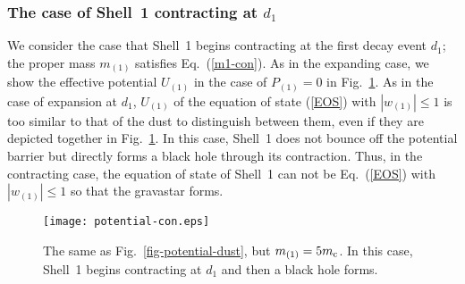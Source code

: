 \documentclass[aps,preprint,preprintnumber,nofootinbib,amsmath,amssymb,ascmac,bm,12pt]{revtex4}
\newcommand{\mo}{m_{(1)}}
\newcommand{\mc}{m_{\rm c}}
\newcommand{\Uon}{U_{(1)}}
\begin{document}
\subsubsection{The case of Shell~1 contracting at $d_1$}

We consider the case that Shell~1 begins contracting at the first decay event $d_1$; the proper mass $\mo$ 
satisfies Eq.~(\ref{m1-con}). As in the expanding case, we show the effective potential $\Uon$ 
in the case of $P_{(1)}=0$ in Fig.~\ref{fig-potential-dust-con}. 
As in the case of expansion at $d_1$, $\Uon$ of the equation of state (\ref{EOS})  
with $\left|w_{(1)}\right|\leq1$ is too similar to that of the dust to distinguish between them, 
even if they are depicted together in Fig.~\ref{fig-potential-dust-con}. 
In this case, Shell~1 does not bounce off the 
potential barrier but directly forms a black hole through its contraction. 
Thus, in the contracting case, the equation of state of Shell~1 can not 
be Eq.~(\ref{EOS}) with $\left|w_{(1)}\right|\leq1$ so that the gravastar forms. 

\begin{figure}[htbp]
 \begin{center}
 \texttt{[image: potential-con.eps]}
 \end{center}
 \caption{
The same as Fig.~\ref{fig-potential-dust}, but $\mo=5\mc$. 
In this case, Shell~1 begins contracting at $d_1$ and then a black hole forms. }
 \label{fig-potential-dust-con}
\end{figure}
\end{document}
